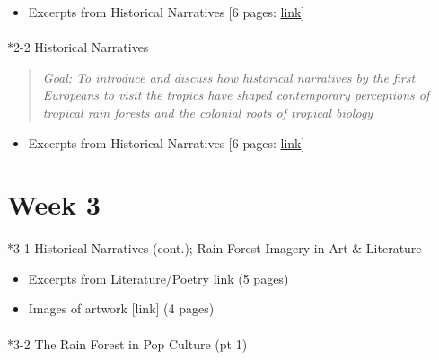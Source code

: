 \documentclass[
  10pt,
  letterpaper,
  oneside,
  open=any]{scrbook}
\makeatletter
\let\oldparagraph\paragraph
\renewcommand{\paragraph}{
    \@ifstar
      \xxxParagraphStar
      \xxxParagraphNoStar
  }
\newcommand{\xxxParagraphStar}[1]{\oldparagraph*{#1}\mbox{}}
\newcommand{\xxxParagraphNoStar}[1]{\oldparagraph{#1}\mbox{}}
\providecommand{\tightlist}{%
  \setlength{\itemsep}{0pt}\setlength{\parskip}{0pt}}
\makeatother
\begin{document}
\begin{itemize}
\tightlist
\item
  Excerpts from Historical Narratives {[}6 pages:
  \href{https://ids2935.netlify.app/uploads/historical_narratives.pdf}{link}{]}
\end{itemize}

\paragraph*{2-2 Historical Narratives}\label{historical-narratives-1}

\begin{quote}
\emph{Goal: To introduce and discuss how historical narratives by the
first Europeans to visit the tropics have shaped contemporary
perceptions of tropical rain forests and the colonial roots of tropical
biology}
\end{quote}

\begin{itemize}
\tightlist
\item
  Excerpts from Historical Narratives {[}6 pages:
  \href{https://ids2935.netlify.app/uploads/historical_narratives.pdf}{link}{]}
\end{itemize}

\section*{Week 3}\label{week-3}


\paragraph*{3-1 Historical Narratives (cont.); Rain Forest Imagery in
Art \&
Literature}\label{historical-narratives-cont.-rain-forest-imagery-in-art-literature}

\begin{itemize}
\tightlist
\item
  Excerpts from Literature/Poetry
  \href{https://ids2935.netlify.app/03_trf_culture/lit_poetry.pdf}{link}
  (5 pages)
\item
  Images of artwork {[}link{]} (4 pages)
\end{itemize}

\paragraph*{3-2 The Rain Forest in Pop Culture (pt
1)}\label{the-rain-forest-in-pop-culture-pt-1}
\end{document}
